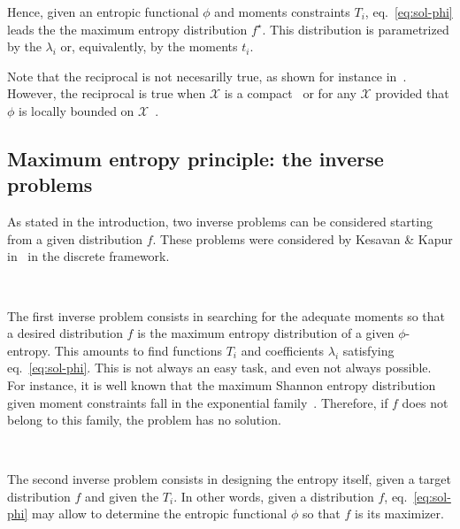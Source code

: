 \documentclass[english,sort&compress]{elsarticle}
\theoremstyle{definition}
\theoremstyle{plain}
\theoremstyle{plain}
\def\X{\mathcal{X}}
\begin{document}
Hence,  given  an entropic  functional  $\phi$  and moments  constraints  $T_i$,
eq.~\eqref{eq:sol-phi}  leads the  the maximum  entropy distribution  $f^\star$.
This distribution  is parametrized by  the $\lambda_i$ or, equivalently,  by the
moments $t_i$.

Note  that  the reciprocal  is  not  necesarilly  true,  as shown  for  instance
in~\cite{BorLew93}.   However,  the   reciprocal  is   true  when   $\X$  is   a
compact~\cite{Gir97} or for any $\X$ provided  that $\phi$ is locally bounded on
$\X$~\cite{Gir07}.





\subsection{Maximum entropy principle: the inverse problems}

As stated in the introduction, two inverse problems can be considered starting
from a given distribution $f$. These problems were considered by Kesavan \&
Kapur in~\cite{KesKap89} in the discrete framework.

\

The first inverse problem consists in searching for the adequate moments so that
a desired distribution $f$ is the maximum entropy distribution of a given
$\phi$-entropy. This amounts to find functions $T_i$ and
coefficients $\lambda_i$ satisfying eq.~\eqref{eq:sol-phi}. 
This is not always an easy task, and even not always possible. For instance, it
is well known that the maximum Shannon entropy distribution given moment
constraints fall in the exponential family~\cite{CovTho06, BorLew91:05,
 Arn01}. Therefore, if $f$ does not belong to this family, the problem has no
solution.


\

The second  inverse problem consists  in designing  the entropy itself,  given a
target  distribution  $f$  and  given  the  $T_i$.   In  other  words,  given  a
distribution  $f$, eq.~\eqref{eq:sol-phi}  may allow  to determine  the entropic
functional $\phi$ so that $f$ is its maximizer.
\end{document}
